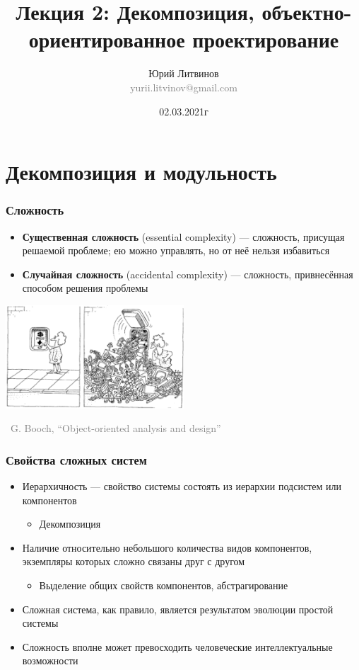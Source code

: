 \documentclass[xetex,mathserif,serif]{beamer}
\title[Декомпозиция, ООП]{Лекция 2: Декомпозиция, объектно-ориентированное проектирование}
\author[Юрий Литвинов]{Юрий Литвинов\\\small{\textcolor{gray}{yurii.litvinov@gmail.com}}}
\date{02.03.2021г}
\newcommand{\attribution}[1] {
    \begin{flushright}\begin{scriptsize}\textcolor{gray}{\textcopyright\, #1}\end{scriptsize}\end{flushright}
}
\begin{document}
    \frame{\titlepage}

    \section{Декомпозиция и модульность}

    \begin{frame}
        \frametitle{Сложность}
        \begin{itemize}
            \item \textbf{Существенная сложность} (essential complexity) --- сложность, присущая решаемой проблеме; ею можно управлять, но от неё нельзя избавиться
            \item \textbf{Случайная сложность} (accidental complexity) --- сложность, привнесённая способом решения проблемы
        \end{itemize}
        \vskip 0.5cm
        \begin{center}
            \includegraphics[width=0.5\textwidth]{complexityHiding.png}
        \end{center}
        \attribution{G. Booch, ``Object-oriented analysis and design''}
    \end{frame}

    \begin{frame}
        \frametitle{Свойства сложных систем}
        \begin{itemize}
            \item Иерархичность --- свойство системы состоять из иерархии подсистем или компонентов
            \begin{itemize}
                \item Декомпозиция
            \end{itemize}
            \item Наличие относительно небольшого количества видов компонентов, экземпляры которых сложно связаны друг с другом
            \begin{itemize}
                \item Выделение общих свойств компонентов, абстрагирование
            \end{itemize}
            \item Сложная система, как правило, является результатом эволюции простой системы
            \item Сложность вполне может превосходить человеческие интеллектуальные возможности
        \end{itemize}
    \end{frame}
\end{document}
